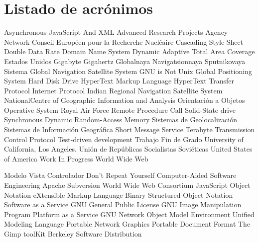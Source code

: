 \chapter{Listado de acrónimos}

{\small
\begin{acronym}[XXXXXXXX]
	         {Asynchronous JavaScript And XML}
	        {Advanced Research Projects Agency Network}
	           {Conseil Européen pour la Recherche Nucléaire}
	            {Cascading Style Sheet}
	            {Double Data Rate}
	            {Domain Name System}
	        {Dynamic Adaptive Total Area Coverage}
	         {Estados Unidos}
	             {Gigabyte}
	            {Gigahertz}
	        {Globalnaya Navigatsionnaya Sputnikovaya Sistema}
	           {Global Navigation Satellite System}
	            {\acs{GNU} is Not Unix}
	            {Global Positioning System}
	            {Hard Disk Drive}
	           {HyperText Markup Language}
	           {HyperText Transfer Protocol}
	             {Internet Protocol}
	          {Indian Regional Navigation Satellite System}
	          {NationalCentre of Geographic Information and Analysis}
	             {Orientación a Objetos}
	             {Operative System}
	            {Royal Air Force}
	            {Remote Procedure Call}
	            {Solid-State drive}
	          {Synchronous Dynamic Random-Access Memory}
	             {Sistemas de Geolocalización}
	            {Sistemas de Información Geográfica}
	            {Short Message Service}
	             {Terabyte}
	            {Transmission Control Protocol}
	            {Test-driven development}
	            {Trabajo Fin de Grado}
	           {University of California, Los Angeles}.
	           {Unión de Repúblicas Socialistas Soviéticas}
	            {United States of America}
	            {Work In Progress}
	            {World Wide Web}
	
			{Modelo Vista Controlador}
			{Don't Repeat Yourself}
			{Computer-Aided Software Engineering}
			{Apache Subversion}
			{World Wide Web Consortium}
			{JavaScript Object Notation}
			{eXtensible Markup Language}
			{Binary Structured Object Notation}
			{Software as a Service}
			{\acs{GNU} General Public License}
			{\acs{GNU} Image Manipulation Program} 
			{Platform as a Service}
		{GNU Network Object Model Environment}
			{Unified Modeling Language}
			{Portable Network Graphics}
			{Portable Document Format}
			{The Gimp toolKit}
			{Berkeley Software Distribution}
\end{acronym}
}


